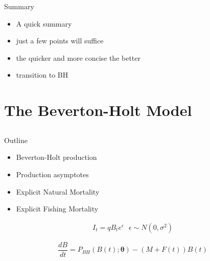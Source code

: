 \documentclass[ xcolor = pdftex, dvipsnames, table ]{beamer}
\begin{document}

%
\begin{frame}{Summary}
\begin{itemize}
\color{red}
\setlength\itemsep{1em}
	\item A quick summary
	\item just a few points will suffice
	\item the quicker and more concise the better
	\item transition to BH
\end{itemize}
\end{frame}

%
\section{The Beverton-Holt Model}
\subsection{}
\begin{frame}{Outline}
\end{frame}

%
\begin{frame}
	\begin{minipage}[h!]{0.49\textwidth}
	\begin{itemize}
	\setlength\itemsep{1em}
	\item Beverton-Holt production	
	\item Production asymptotes
	\item Explicit Natural Mortality
	\item Explicit Fishing Mortality 
	\end{itemize}
	\end{minipage}
	\begin{minipage}[h!]{0.49\textwidth}
        \begin{align*}
        I_t = q B_t e^\epsilon ~~~ \epsilon\sim N(0, \sigma^2)
        \end{align*}

        \begin{equation*}
        \frac{dB}{dt} = P_{BH}(B(t); \bm{\theta}) -(M + F(t))B(t)
        \end{equation*}
	\end{minipage}
\end{frame}
\end{document}
